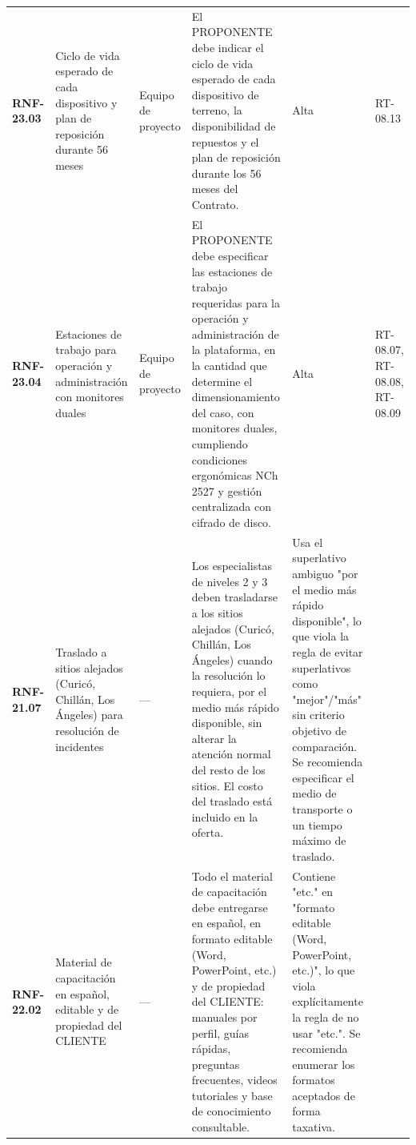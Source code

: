 \begin{longtable}{p{1.7cm} p{2.3cm} p{1.9cm} p{5.0cm} p{1.1cm} p{1.9cm}}
\textbf{RNF-23.03} & Ciclo de vida esperado de cada dispositivo y plan de reposición durante 56 meses & Equipo de proyecto & El PROPONENTE debe indicar el ciclo de vida esperado de cada dispositivo de terreno, la disponibilidad de repuestos y el plan de reposición durante los 56 meses del Contrato. & Alta & RT-08.13 \\
\textbf{RNF-23.04} & Estaciones de trabajo para operación y administración con monitores duales & Equipo de proyecto & El PROPONENTE debe especificar las estaciones de trabajo requeridas para la operación y administración de la plataforma, en la cantidad que determine el dimensionamiento del caso, con monitores duales, cumpliendo condiciones ergonómicas NCh 2527 y gestión centralizada con cifrado de disco. & Alta & RT-08.07, RT-08.08, RT-08.09 \\
\textbf{RNF-21.07} & Traslado a sitios alejados (Curicó, Chillán, Los Ángeles) para resolución de incidentes & — & Los especialistas de niveles 2 y 3 deben trasladarse a los sitios alejados (Curicó, Chillán, Los Ángeles) cuando la resolución lo requiera, por el medio más rápido disponible, sin alterar la atención normal del resto de los sitios. El costo del traslado está incluido en la oferta. & Usa el superlativo ambiguo "por el medio más rápido disponible", lo que viola la regla de evitar superlativos como "mejor"/"más" sin criterio objetivo de comparación. Se recomienda especificar el medio de transporte o un tiempo máximo de traslado. &  \\
\textbf{RNF-22.02} & Material de capacitación en español, editable y de propiedad del CLIENTE & — & Todo el material de capacitación debe entregarse en español, en formato editable (Word, PowerPoint, etc.) y de propiedad del CLIENTE: manuales por perfil, guías rápidas, preguntas frecuentes, videos tutoriales y base de conocimiento consultable. & Contiene "etc." en "formato editable (Word, PowerPoint, etc.)", lo que viola explícitamente la regla de no usar "etc.". Se recomienda enumerar los formatos aceptados de forma taxativa. &  \\
\end{longtable}

